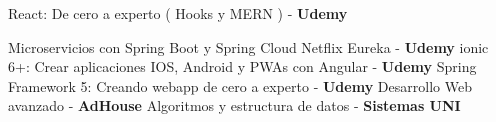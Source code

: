 %


\begin{scholarship}
					{React: De cero a experto ( Hooks y MERN ) - \textbf{Udemy}
					}
					
					{Microservicios con Spring Boot y Spring Cloud Netflix Eureka - \textbf{Udemy} }
					{ionic 6+: Crear aplicaciones IOS, Android y PWAs con Angular - \textbf{Udemy}}
					{Spring Framework 5: Creando webapp de cero a experto - \textbf{Udemy}}
					{Desarrollo Web avanzado - \textbf{AdHouse}}
					{Algoritmos y estructura de datos - \textbf{Sistemas UNI}}

\end{scholarship}